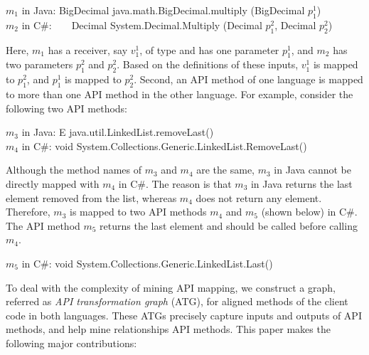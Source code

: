 \begin{CodeOut}
$m_1$ in Java: BigDecimal java.math.BigDecimal.multiply (BigDecimal $p_1^1$)\\
\hspace*{0.12in}$m_2$ in C\#:\ \ \ \  Decimal
System.Decimal.Multiply (Decimal $p_1^2$, Decimal $p_2^2$)
\end{CodeOut}

Here, $m_1$ has a receiver, say $v_1^1$, of type 
and has one parameter $p_1^1$, and $m_2$ has two parameters $p_1^2$
and $p_2^2$. Based on the definitions of these inputs, $v_1^1$ is
mapped to $p_1^2$, and $p_1^1$ is mapped to $p_2^2$. Second, an API
method of one language is mapped to more than one API method in the
other language. For example, consider the following two API methods:

\begin{CodeOut}
$m_3$ in Java: E java.util.LinkedList.removeLast()\\
\hspace*{0.12in}$m_4$ in C\#: void System.Collections.Generic.LinkedList.RemoveLast()
\end{CodeOut}

Although the method names of $m_3$ and $m_4$ are the same, $m_3$ in Java
cannot be directly mapped with $m_4$ in C\#. The reason is that $m_3$ in Java
returns the last element removed from the list, whereas $m_4$ does not return any
element. Therefore, $m_3$ is mapped to two API methods $m_4$ and $m_5$ (shown below) in C\#.
The API method $m_5$ returns the last element and should be called before calling $m_4$.

\begin{CodeOut}
$m_5$ in C\#: void System.Collections.Generic.LinkedList.Last()
\end{CodeOut}

To deal with the complexity of mining API mapping, we construct a
graph, referred as \emph{API transformation graph} (ATG), for
aligned methods of the client code in both languages. These ATGs
precisely capture inputs and outputs of API methods, and help mine
relationships API methods. This paper makes the following major
contributions:

